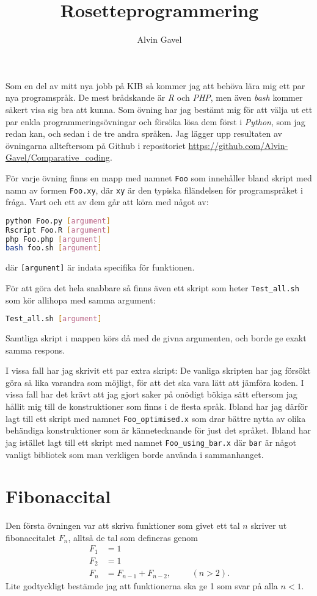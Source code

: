 \documentclass[10pt, twoside,a4paper]{article}
\title{Rosetteprogrammering}
\author{Alvin Gavel}
\date{}                                           %
\begin{document}
\maketitle

\noindent
Som en del av mitt nya jobb på KIB så kommer jag att behöva lära mig ett par nya programspråk. De mest brådskande är \emph{R} och \emph{PHP}, men även \emph{bash} kommer säkert visa sig bra att kunna. Som övning har jag bestämt mig för att välja ut ett par enkla programmeringsövningar och försöka lösa dem först i \emph{Python}, som jag redan kan, och sedan i de tre andra språken. Jag lägger upp resultaten av övningarna allteftersom på Github i repositoriet \url{https://github.com/Alvin-Gavel/Comparative_coding}.

För varje övning finns en mapp med namnet \verb+Foo+ som innehåller bland skript med namn av formen \verb+Foo.xy+, där \verb+xy+ är den typiska filändelsen för programspråket i fråga. Vart och ett av dem går att köra med något av:
\begin{lstlisting}[language=bash]
python Foo.py [argument]
Rscript Foo.R [argument]
php Foo.php [argument]
bash foo.sh [argument]
\end{lstlisting}
där \verb+[argument]+ är indata specifika för funktionen.

För att göra det hela snabbare så finns även ett skript som heter \verb+Test_all.sh+ som kör allihopa med samma argument:
\begin{lstlisting}[language=bash]
Test_all.sh [argument]
\end{lstlisting}
Samtliga skript i mappen körs då med de givna argumenten, och borde ge exakt samma respons.

I vissa fall har jag skrivit ett par extra skript: De vanliga skripten har jag försökt göra så lika varandra som möjligt, för att det ska vara lätt att jämföra koden. I vissa fall har det krävt att jag gjort saker på onödigt bökiga sätt eftersom jag hållit mig till de konstruktioner som finns i de flesta språk. Ibland har jag därför lagt till ett skript med namnet \verb+Foo_optimised.x+ som drar bättre nytta av olika behändiga konstruktioner som är kännetecknande för just det språket. Ibland har jag istället lagt till ett skript med namnet \verb+Foo_using_bar.x+ där \verb+bar+ är något vanligt bibliotek som man verkligen borde använda i sammanhanget.

\newpage
\tableofcontents


\newpage
\section{Fibonaccital}
Den första övningen var att skriva funktioner som givet ett tal $n$ skriver ut fibonaccitalet $F_n$, alltså de tal som defineras genom
\begin{align}
F_1 &= 1 \\
F_2 &= 1 \\
F_n &= F_{n-1} + F_{n-2}, \hspace{1cm}(n > 2).
\end{align}
Lite godtyckligt bestämde jag att funktionerna ska ge 1 som svar på alla $n < 1$.
\end{document}
